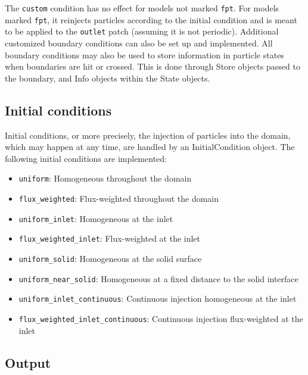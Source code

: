 \documentclass[11pt]{article}
\begin{document}
The \lstinline{custom} condition has no effect for models not marked \lstinline{fpt}. For models marked \lstinline{fpt}, it reinjects particles according to the initial condition and is meant to be applied to the \lstinline{outlet} patch (assuming it is not periodic). Additional customized boundary conditions can also be set up and implemented. All boundary conditions may also be used to store information in particle states when boundaries are hit or crossed. This is done through Store objects passed to the boundary, and Info objects within the State objects.

\subsection{Initial conditions}

Initial conditions, or more precisely, the injection of particles into the domain, which may happen at any time, are handled by an InitialCondition object.
The following initial conditions are implemented:
%
\begin{itemize}
\item \lstinline{uniform}: Homogeneous throughout the domain
\item \lstinline{flux_weighted}: Flux-weighted throughout the domain
\item \lstinline{uniform_inlet}: Homogeneous at the inlet
\item \lstinline{flux_weighted_inlet}: Flux-weighted at the inlet
\item \lstinline{uniform_solid}: Homogeneous at the solid surface
\item \lstinline{uniform_near_solid}: Homogeneous at a fixed distance to the solid interface
\item \lstinline{uniform_inlet_continuous}: Continuous injection homogeneous at the inlet
\item \lstinline{flux_weighted_inlet_continuous}: Continuous injection flux-weighted at the inlet
\end{itemize}

\subsection{Output}
\end{document}
